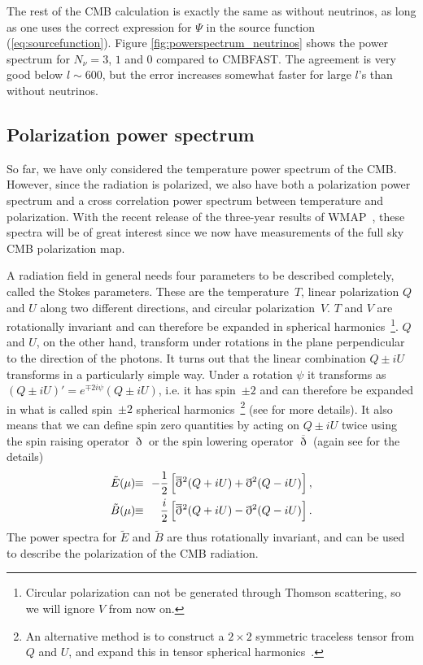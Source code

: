 \documentclass[twocolumn,nofootinbib,amsmath,amssymb]{revtex4}
\newcommand{\ba}{\begin{eqnarray}}
\newcommand{\ea}{\end{eqnarray}}
\newcommand{\hs}{\hspace{-1.12mm}}
\newcommand{\eqequiv}{\hs & \equiv & \hs}
\newcommand{\addspace}[2][3mm]{\raisebox{0mm}[#1][#1]{$\displaystyle #2$}}
\newcommand{\addsmsp}[1]{\addspace[2mm]{#1}}
\begin{document}
The rest of the CMB calculation is exactly the same as without neutrinos, as
long as one uses the correct expression for $\Psi$ in the source function
(\ref{eq:sourcefunction}). Figure \ref{fig:powerspectrum_neutrinos} shows the
power spectrum for $N_\nu = 3$, $1$ and $0$ compared to CMBFAST. The agreement
is very good below $l \sim 600$, but the error increases somewhat faster for
large $l$'s than without neutrinos.


\subsection{Polarization power spectrum}
\label{cha:polarization}

So far, we have only considered the temperature power spectrum of the CMB.
However, since the radiation is polarized, we also have both a polarization
power spectrum and a cross correlation power spectrum between temperature and
polarization. With the recent release of the three-year results of
WMAP~\cite{WMAP_threeyear}, these spectra will be of great interest since we
now have measurements of the full sky CMB polarization map.

A radiation field in general needs four parameters to be described completely,
called the Stokes parameters. These are the temperature~$T$, linear
polarization $Q$ and $U$ along two different directions, and circular
polarization~$V$. $T$ and $V$ are rotationally invariant and can therefore be
expanded in spherical harmonics~\footnote{Circular polarization can not be
generated through Thomson scattering, so we will ignore $V$ from now on.}. $Q$
and $U$, on the other hand, transform under rotations in the plane
perpendicular to the direction of the photons. It turns out that the linear
combination $Q \pm iU$ transforms in a particularly simple way. Under a
rotation $\psi$ it transforms as $(Q \pm iU)' = e^{\mp 2i\psi} (Q \pm iU)$,
i.e. it has spin~$\pm 2$ and can therefore be expanded in what is called
spin~$\pm 2$ spherical harmonics~\footnote{An alternative method is to
construct a $2 \times 2$ symmetric traceless tensor from $Q$ and $U$, and
expand this in tensor spherical harmonics~\cite{KKS}.} (see \cite{Zald_Seljak}
for more details). It also means that we can define spin zero quantities by
acting on $Q \pm iU$ twice using the spin raising operator $\eth$ or the spin
lowering operator $\overline{\eth}$ (again see \cite{Zald_Seljak} for the
details)
\ba
  \tilde{E}(\mu) \eqequiv -\frac{1}{2} \left[ \addsmsp{
    \overline{\eth} {}^{\:\! 2} (Q+iU) + \eth^2(Q-iU)
  } \right] , \nonumber \\
  \tilde{B}(\mu) \eqequiv \frac{i}{2} \left[ \addsmsp{
    \overline{\eth} {}^{\:\! 2} (Q+iU) - \eth^2(Q-iU)
  } \right] .
\ea
The power spectra for $\tilde{E}$ and $\tilde{B}$ are thus rotationally
invariant, and can be used to describe the polarization of the CMB radiation.
\end{document}
